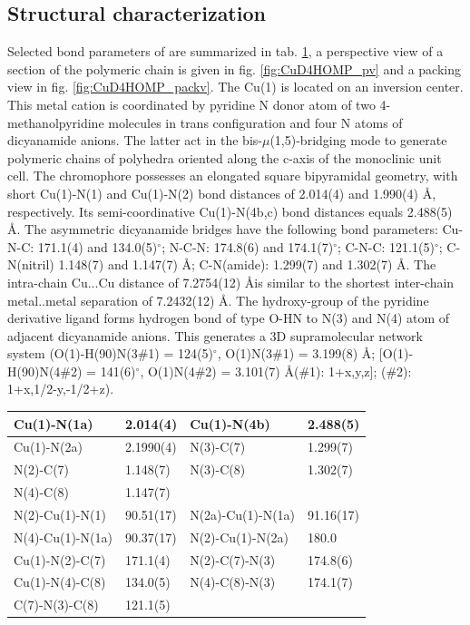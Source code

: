 \subsection{Structural characterization}
Selected bond parameters of  are summarized in tab. \ref{batab:CuA4MOP}, a perspective view of a section of the polymeric chain is given in fig. \ref{fig:CuD4HOMP_pv} and a packing view in fig. \ref{fig:CuD4HOMP_packv}.  The Cu(1) is located on an inversion center. This metal cation is coordinated by pyridine N donor atom of two 4-methanolpyridine molecules in trans configuration and four N atoms of dicyanamide anions. The latter act in the bis-$\mu$(1,5)-bridging mode to generate polymeric chains of polyhedra oriented along the c-axis of the monoclinic unit cell. The  chromophore possesses an elongated square bipyramidal geometry, with short Cu(1)-N(1) and Cu(1)-N(2) bond distances of 2.014(4) and 1.990(4) \AA, respectively. Its semi-coordinative Cu(1)-N(4b,c) bond distances equals 2.488(5) \AA. The asymmetric dicyanamide bridges have the following bond parameters: Cu-N-C: 171.1(4) and 134.0(5)$^\circ$; N-C-N: 174.8(6) and 174.1(7)$^\circ$; C-N-C: 121.1(5)$^\circ$; C-N(nitril) 1.148(7) and 1.147(7) \AA; C-N(amide): 1.299(7) and 1.302(7) \AA. The intra-chain Cu...Cu distance of 7.2754(12) \AA is similar to the shortest inter-chain metal..metal separation of 7.2432(12) \AA. The hydroxy-group of the pyridine derivative ligand forms hydrogen bond of type O-H\ce{***}N to N(3) and N(4) atom of adjacent dicyanamide anions. This generates a 3D supramolecular network system (O(1)-H(90)\ce{***}N(3\#1) = 124(5)$^\circ$, O(1)\ce{***}N(3\#1) = 3.199(8) \AA; [O(1)-H(90)\ce{***}N(4\#2) = 141(6)$^\circ$, O(1)\ce{***}N(4\#2) = 3.101(7) \AA (\#1): 1+x,y,z]; (\#2): 1+x,1/2-y,-1/2+z).

\renewcommand{\arraystretch}{1.1}
\begin{table}[htpb!]
\centering
{}
\begin{tabular}{|l|l|l|l|}
\hline
Cu(1)-N(1a) & 2.014(4) & Cu(1)-N(4b) & 2.488(5)\\
\hline
Cu(1)-N(2a) & 2.1990(4)& N(3)-C(7) & 1.299(7)\\
\hline
N(2)-C(7) & 1.148(7) & N(3)-C(8) & 1.302(7)\\
\hline
N(4)-C(8) & 1.147(7) &  & \\
\hline
\hline
N(2)-Cu(1)-N(1) & 90.51(17) & N(2a)-Cu(1)-N(1a) & 91.16(17)\\
\hline
N(4)-Cu(1)-N(1a) & 90.37(17) & N(2)-Cu(1)-N(2a) & 180.0\\
\hline
Cu(1)-N(2)-C(7) & 171.1(4) & N(2)-C(7)-N(3) & 174.8(6)\\
\hline
Cu(1)-N(4)-C(8)& 134.0(5) &N(4)-C(8)-N(3) & 174.1(7)\\
\hline
C(7)-N(3)-C(8)& 121.1(5) & &\\
\hline
\end{tabular}
\label{batab:CuA4MOP}
\end{table}


